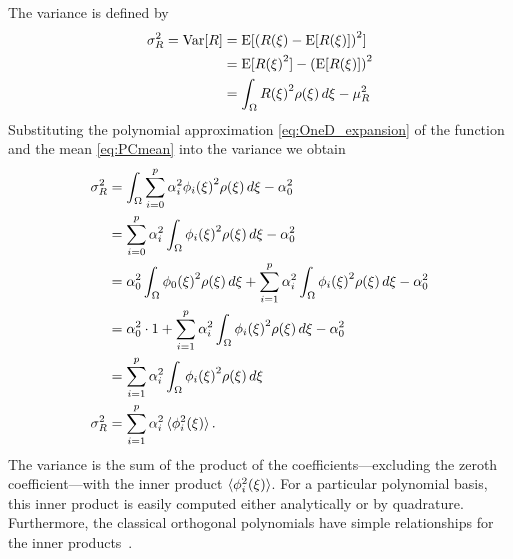 The variance is defined by
\begin{align}
	\sigma_R^2 = \mathrm{Var}[R] & = \mathrm{E}[{(R(\xi) - \mathrm{E}[R(\xi)])}^2] \\
  & = \mathrm{E}[R{(\xi)}^2] - {(\mathrm{E}[R(\xi)])}^2 \\
  & = \int_\Omega R{(\xi)}^2 \rho(\xi)\, d\xi - \mu_R^2
  \label{eq:varDef}
\end{align}
Substituting the polynomial approximation \cref{eq:OneD_expansion} of the function and the mean \cref{eq:PCmean} into the variance we obtain
\begin{align}
  \sigma_R^2 & = \int_\Omega \sum_{i=0}^p \alpha_i^2 \phi_i{(\xi)}^2 \rho(\xi)\, d\xi - \alpha_0^2 \\
  & = \sum_{i=0}^p \alpha_i^2 \int_\Omega \phi_i{(\xi)}^2 \rho(\xi)\, d\xi - \alpha_0^2 \\
  & = \alpha_0^2 \int_\Omega \phi_0{(\xi)}^2\rho(\xi)\, d\xi + \sum_{i=1}^p \alpha_i^2 \int_\Omega \phi_i{(\xi)}^2 \rho(\xi)\, d\xi - \alpha_0^2 \\
  & = \alpha_0^2 \cdot 1 + \sum_{i=1}^p \alpha_i^2 \int_\Omega \phi_i{(\xi)}^2 \rho(\xi)\, d\xi - \alpha_0^2 \\
  & = \sum_{i=1}^p \alpha_i^2 \int_\Omega \phi_i{(\xi)}^2 \rho(\xi)\, d\xi \\
  \sigma_R^2 & = \sum_{i=1}^p \alpha_i^2 \braket{\phi_i^2(\xi)}. \label{eq:PCvar}
  \end{align}
The variance is the sum of the product of the coefficients---excluding the zeroth coefficient---with the inner product $\braket{\phi_i^2(\xi)}$. For a particular polynomial basis, this inner product is easily computed either analytically or by quadrature. Furthermore, the classical orthogonal polynomials have simple relationships for the inner products~\cite{Weisstein}.


